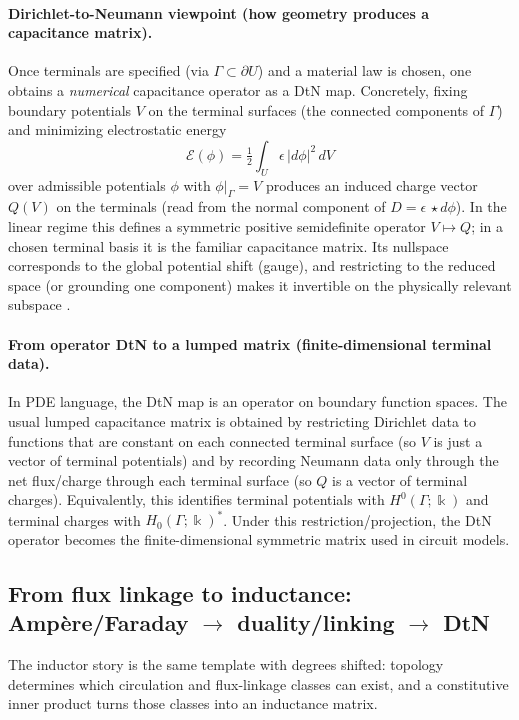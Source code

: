 \documentclass[11pt]{article}
\begin{document}
\paragraph{Dirichlet-to-Neumann viewpoint (how geometry produces a capacitance matrix).}
Once terminals are specified (via $\Gamma\subset\partial U$) and a material law is chosen, one obtains a \emph{numerical} capacitance operator as a DtN map.
Concretely, fixing boundary potentials $V$ on the terminal surfaces (the connected components of $\Gamma$) and minimizing electrostatic energy
\[
\mathcal{E}(\phi)=\tfrac12\int_U \epsilon\,|d\phi|^2\,dV
\]
over admissible potentials $\phi$ with $\phi|_{\Gamma}=V$ produces an induced charge vector $Q(V)$ on the terminals (read from the normal component of $D=\epsilon\,\star d\phi$).
In the linear regime this defines a symmetric positive semidefinite operator $V\mapsto Q$; in a chosen terminal basis it is the familiar capacitance matrix.
Its nullspace corresponds to the global potential shift (gauge), and restricting to the reduced space (or grounding one component) makes it invertible on the physically relevant subspace \cite{jackson_em_1998}.

\paragraph{From operator DtN to a lumped matrix (finite-dimensional terminal data).}
In PDE language, the DtN map is an operator on boundary function spaces.
The usual lumped capacitance matrix is obtained by restricting Dirichlet data to functions that are constant on each connected terminal surface (so $V$ is just a vector of terminal potentials) and by recording Neumann data only through the net flux/charge through each terminal surface (so $Q$ is a vector of terminal charges).
Equivalently, this identifies terminal potentials with $H^0(\Gamma;\Bbbk)$ and terminal charges with $H_0(\Gamma;\Bbbk)^\ast$.
Under this restriction/projection, the DtN operator becomes the finite-dimensional symmetric matrix used in circuit models.

\subsection{From flux linkage to inductance: Amp\`ere/Faraday \texorpdfstring{$\to$}{->} duality/linking \texorpdfstring{$\to$}{->} DtN}
\label{sec:flux-to-inductance}
The inductor story is the same template with degrees shifted: topology determines which circulation and flux-linkage classes can exist, and a constitutive inner product turns those classes into an inductance matrix.
\end{document}
